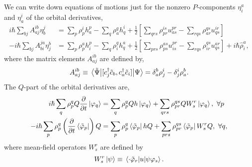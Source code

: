 We can write down equations of motions just for the nonzero $P$-components
$\eta^a_i$ and $\eta^i_a$ of the orbital derivatives,
\begin{align}
    i\hbar \sum_{bj}A^{ib}_{aj}\eta^j_b 
        &= \sum_p \rho^i_p h^p_a - \sum_q \rho^q_a h^i_q
        + \frac{1}{2}\left[ 
              \sum_{qrs} \rho^{is}_{pr} u^{pr}_{as}
            - \sum_{rqs} \rho^{qs}_{ar} u^{ir}_{qs}     
        \right] \\
    - i\hbar \sum_{bj} A^{ja}_{bi}\eta^b_j 
        &= \sum_p \rho^a_p h^p_i - \sum_q \rho^q_i h^a_q
        + \frac{1}{2} \left[
              \sum_{prs} \rho^{as}_{ps} u^{pr}_{is}
            - \sum_{rqs} \rho^{qs}_{ir} u^{ar}_{qs}
        \right]
        + i\hbar \hat{\rho}_i^a,
\end{align}
where the matrix elements $A^{ib}_{aj}$ are defined by,
\begin{equation}
    A^{ib}_{aj} \equiv 
    \mel{\tilde{\Psi}}{[c^\dagger_j\tilde{c}_b, c^\dagger_a\tilde{c}_i]}{\Psi}
    = \delta^b_a\rho^i_j - \delta^i_j\rho^b_a.
\end{equation}
The $Q$-part of the orbital derivatives are,
\begin{align}
    i\hbar\sum_q \rho^q_p Q \frac{\partial}{\partial t} \ket{\varphi_q}
        &= \sum_q \rho^q_p Q h\ket{\varphi_q}
        + \sum_{qrs} \rho^{qs}_{pr}Q W^r_s\ket{\varphi_q}, \ \forall p \\
    -i\hbar\sum_p \rho^q_p \left(\frac{\partial}{\partial t}\bra{\tilde{\varphi}_p} \right)Q
        &= \sum_p\rho^q_p \bra{\tilde{\varphi}_p}hQ
        + \sum_{prs} \rho^{qs}_{pr} \bra{\tilde{\varphi}_p}W^r_s Q, \ \forall q,
\end{align}
where mean-field operators $W^r_s$ are defined by 
\begin{equation}
    W^r_s\ket{\psi} \equiv 
    \mel{\cdot \tilde{\varphi}_r}{u}{\psi\varphi_s}.
\end{equation}

